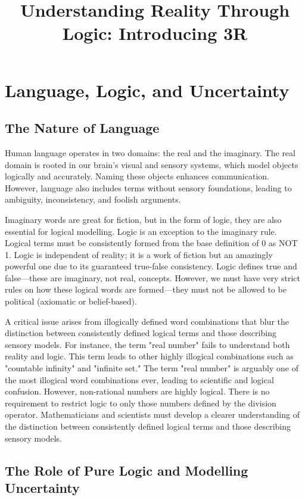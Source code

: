 \documentclass{article}
\title{Understanding Reality Through Logic: Introducing 3R}
\date{}
\begin{document}
\maketitle

\section*{Language, Logic, and Uncertainty}

\subsection*{The Nature of Language}

Human language operates in two domains: the real and the imaginary. The real domain is rooted in our brain's visual and sensory systems, which model objects logically and accurately. Naming these objects enhances communication. However, language also includes terms without sensory foundations, leading to ambiguity, inconsistency, and foolish arguments.

Imaginary words are great for fiction, but in the form of logic, they are also essential for logical modelling. Logic is an exception to the imaginary rule. Logical terms must be consistently formed from the base definition of 0 as NOT 1. Logic is independent of reality; it is a work of fiction but an amazingly powerful one due to its guaranteed true-false consistency. Logic defines true and false—these are imaginary, not real, concepts. However, we must have very strict rules on how these logical words are formed—they must not be allowed to be political (axiomatic or belief-based).

A critical issue arises from illogically defined word combinations that blur the distinction between consistently defined logical terms and those describing sensory models. For instance, the term "real number" fails to understand both reality and logic. This term leads to other highly illogical combinations such as "countable infinity" and "infinite set." The term "real number" is arguably one of the most illogical word combinations ever, leading to scientific and logical confusion. However, non-rational numbers are highly logical. There is no requirement to restrict logic to only those numbers defined by the division operator. Mathematicians and scientists must develop a clearer understanding of the distinction between consistently defined logical terms and those describing sensory models.

\subsection*{The Role of Pure Logic and Modelling Uncertainty}
\end{document}
